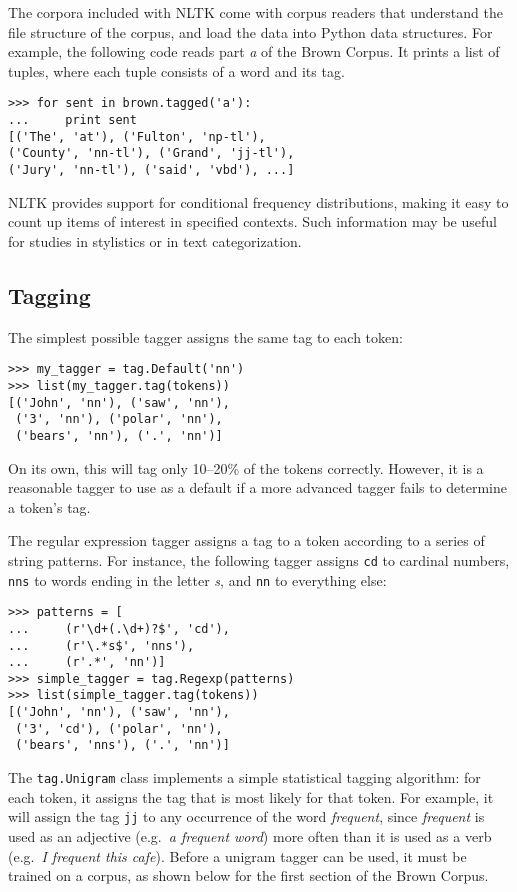 \documentclass[11pt]{article}
\begin{document}
The corpora included with NLTK come with corpus readers that
understand the file structure of the corpus, and load the data into
Python data structures.  For example, the following code reads part \textit{a}
of the Brown Corpus.  It prints a list of tuples, where each tuple
consists of a word and its tag.

{\small\begin{verbatim}
>>> for sent in brown.tagged('a'):
...     print sent
[('The', 'at'), ('Fulton', 'np-tl'),
('County', 'nn-tl'), ('Grand', 'jj-tl'),
('Jury', 'nn-tl'), ('said', 'vbd'), ...]
\end{verbatim}}

NLTK provides support for conditional frequency distributions, making
it easy to count up items of interest in specified contexts.  Such
information may be useful for studies in stylistics or in text
categorization.

\subsection{Tagging}

The simplest possible tagger assigns the same tag to each token:

{\small\begin{verbatim}
>>> my_tagger = tag.Default('nn')
>>> list(my_tagger.tag(tokens))
[('John', 'nn'), ('saw', 'nn'),
 ('3', 'nn'), ('polar', 'nn'),
 ('bears', 'nn'), ('.', 'nn')]
\end{verbatim}}

On its own, this will tag only 10--20\% of the tokens correctly.
However, it is a reasonable tagger to use as a default if a more
advanced tagger fails to determine a token's tag.

The regular expression tagger assigns a tag to a token according to a
series of string patterns.  For instance, the following tagger assigns
\texttt{cd} to cardinal numbers, \texttt{nns} to words ending in the
letter \textit{s}, and \texttt{nn} to everything else:

{\small\begin{verbatim}
>>> patterns = [
...     (r'\d+(.\d+)?$', 'cd'),
...     (r'\.*s$', 'nns'),
...     (r'.*', 'nn')]
>>> simple_tagger = tag.Regexp(patterns)
>>> list(simple_tagger.tag(tokens))
[('John', 'nn'), ('saw', 'nn'),
 ('3', 'cd'), ('polar', 'nn'),
 ('bears', 'nns'), ('.', 'nn')]
\end{verbatim}}
    
The \texttt{tag.Unigram} class implements a simple statistical tagging
algorithm: for each token, it assigns the tag that is most likely
for that token. For example, it will assign the tag \texttt{jj} to
any occurrence of the word \textit{frequent}, since \textit{frequent} is used as an
adjective (e.g.\ \textit{a frequent word}) more often than it is used as a
verb (e.g.\ \textit{I frequent this cafe}).
Before a unigram tagger can be used, it must be trained on
a corpus, as shown below for the first section of the Brown Corpus.
\end{document}
